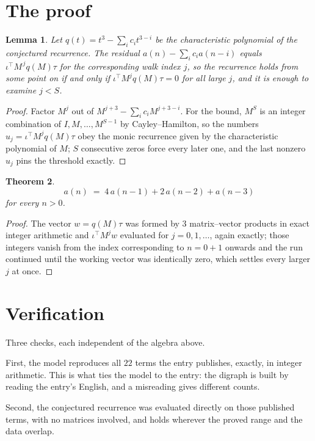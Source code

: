 \documentclass[11pt,a4paper]{article}
\theoremstyle{plain}
\newtheorem{theorem}{Theorem}
\newtheorem{lemma}[theorem]{Lemma}
\theoremstyle{definition}
\begin{document}
\section{The proof}

\begin{lemma}\label{lem:crit}
Let $q(t)=t^{3}-\sum_i c_it^{3-i}$ be the characteristic polynomial of the
conjectured recurrence. The residual $a(n)-\sum_ic_ia(n-i)$ equals
$\iota^{\!\top}M^{\,j}q(M)\tau$ for the corresponding walk index $j$, so the recurrence
holds from some point on if and only if $\iota^{\!\top}M^{j}q(M)\tau=0$ for all large $j$,
and it is enough to examine $j<S$.
\end{lemma}

\begin{proof}
Factor $M^{j}$ out of $M^{j+3}-\sum_ic_iM^{j+3-i}$. For the bound, $M^{S}$
is an integer combination of $I,M,\dots,M^{S-1}$ by Cayley--Hamilton, so the numbers
$u_j=\iota^{\!\top}M^{j}q(M)\tau$ obey the monic recurrence given by the characteristic
polynomial of $M$; $S$ consecutive zeros force every later one, and the last nonzero $u_j$
pins the threshold exactly.
\end{proof}

\begin{theorem}
\[
a(n)\;=\;4\,a(n-1) + 2\,a(n-2) + a(n-3)
\]
for every $n>0$.
\end{theorem}

\begin{proof}
The vector $w=q(M)\tau$ was formed by $3$ matrix--vector products in exact integer
arithmetic and $\iota^{\!\top}M^{j}w$ evaluated for $j=0,1,\dots$, again exactly; those
integers vanish from the index corresponding to $n=0+1$ onwards and the run continued
until the working vector was identically zero, which settles every larger $j$ at once.
\end{proof}

\section{Verification}

Three checks, each independent of the algebra above.

First, the model reproduces all $22$ terms the entry publishes, exactly, in integer
arithmetic. This is what ties the model to the entry: the digraph is built by reading the
entry's English, and a misreading gives different counts.

Second, the conjectured recurrence was evaluated directly on those published terms, with no
matrices involved, and holds wherever the proved range and the data overlap.
\end{document}
